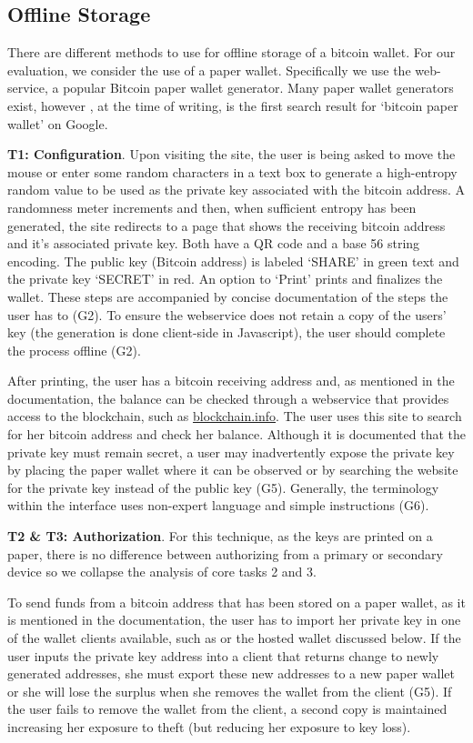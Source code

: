 \subsection{Offline Storage}
There are different methods to use for offline storage of a bitcoin wallet. For our evaluation, we consider the use of a paper wallet. Specifically we use the \paper web-service, a popular Bitcoin paper wallet generator. Many paper wallet generators exist, however \paper, at the time of writing, is the first search result for `bitcoin paper wallet' on Google.

\textbf{T1: Configuration}. Upon visiting the site, the user is being asked to move the mouse or enter some random characters in a text box to generate a high-entropy random value to be used as the private key associated with the bitcoin address. A randomness meter increments and then, when sufficient entropy has been generated, the site redirects to a page that shows the receiving bitcoin address and it's associated private key. Both have a QR code and a base 56 string encoding. The public key (Bitcoin address) is labeled `SHARE' in green text and the private key `SECRET' in red. An option to `Print' prints and finalizes the wallet. These steps are accompanied by concise documentation of the steps the user has to (G2). To ensure the webservice does not retain a copy of the users' key (the generation is done client-side in Javascript), the user should complete the process offline (G2).

After printing, the user has a bitcoin receiving address and, as mentioned in the documentation, the balance can be checked through a webservice that provides access to the blockchain, such as \url{blockchain.info}. The user uses this site to search for her bitcoin address and check her balance. Although it is documented that the private key must remain secret, a user may inadvertently expose the private key by placing the paper wallet where it can be observed or by searching the website for the private key instead of the public key (G5). Generally, the terminology within the \paper interface uses non-expert language and simple instructions (G6).

\textbf{T2 \& T3: Authorization}.
For this technique, as the keys are printed on a paper, there is no difference between authorizing from a primary or secondary device so we collapse the analysis of core tasks 2 and 3.
 
To send funds from a bitcoin address that has been stored on a paper wallet, as it is mentioned in the documentation, the user has to import her private key in one of the wallet clients available, such as \armory or the \block hosted wallet discussed below. If the user inputs the private key address into a client that returns change to newly generated addresses, she must export these new addresses to a new paper wallet or she will lose the surplus when she removes the wallet from the client (G5). If the user fails to remove the wallet from the client, a second copy is maintained increasing her exposure to theft (but reducing her exposure to key loss). 

